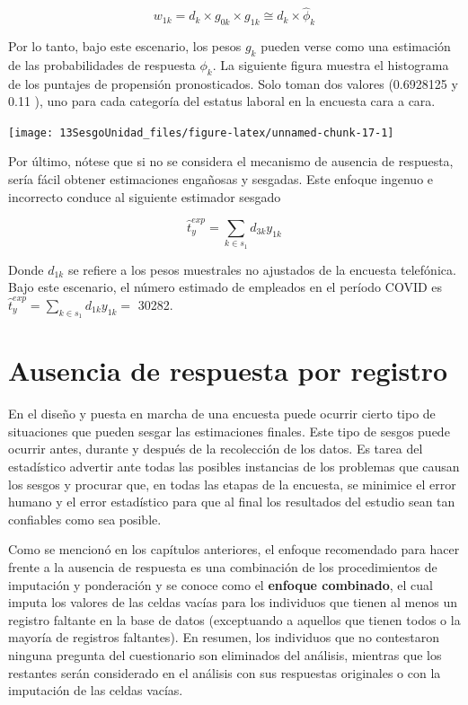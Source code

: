 \documentclass[
  12pt,
]{book}
\begin{document}
\[
w_{1k} = d_k \times g_{0k} \times g_{1k} \cong d_k \times \hat \phi_k
\]

Por lo tanto, bajo este escenario, los pesos \(g_k\) pueden verse como una estimación de las probabilidades de respuesta \(\phi_k\). La siguiente figura muestra el histograma de los puntajes de propensión pronosticados. Solo toman dos valores (0.6928125 y 0.11 ), uno para cada categoría del estatus laboral en la encuesta cara a cara.

\begin{center}\texttt{[image: 13SesgoUnidad\_files/figure-latex/unnamed-chunk-17-1]} \end{center}

Por último, nótese que si no se considera el mecanismo de ausencia de respuesta, sería fácil obtener estimaciones engañosas y sesgadas. Este enfoque ingenuo e incorrecto conduce al siguiente estimador sesgado

\[
\hat{t}_y^{exp}=\sum_{k\in s_1}d_{3k}y_{1k}
\]

Donde \(d_{1k}\) se refiere a los pesos muestrales no ajustados de la encuesta telefónica. Bajo este escenario, el número estimado de empleados en el período COVID es \(\hat{t}_y^{exp}=\sum_{k\in s_1}d_{1k}y_{1k} =\) 30282.

\hypertarget{ausencia-de-respuesta-por-registro}{%
\chapter{Ausencia de respuesta por registro}\label{ausencia-de-respuesta-por-registro}}

En el diseño y puesta en marcha de una encuesta puede ocurrir cierto tipo de situaciones que pueden sesgar las estimaciones finales. Este tipo de sesgos puede ocurrir antes, durante y después de la recolección de los datos. Es tarea del estadístico advertir ante todas las posibles instancias de los problemas que causan los sesgos y procurar que, en todas las etapas de la encuesta, se minimice el error humano y el error estadístico para que al final los resultados del estudio sean tan confiables como sea posible.

Como se mencionó en los capítulos anteriores, el enfoque recomendado para hacer frente a la ausencia de respuesta es una combinación de los procedimientos de imputación y ponderación y se conoce como el \textbf{enfoque combinado}, el cual imputa los valores de las celdas vacías para los individuos que tienen al menos un registro faltante en la base de datos (exceptuando a aquellos que tienen todos o la mayoría de registros faltantes). En resumen, los individuos que no contestaron ninguna pregunta del cuestionario son eliminados del análisis, mientras que los restantes serán considerado en el análisis con sus respuestas originales o con la imputación de las celdas vacías.
\end{document}
